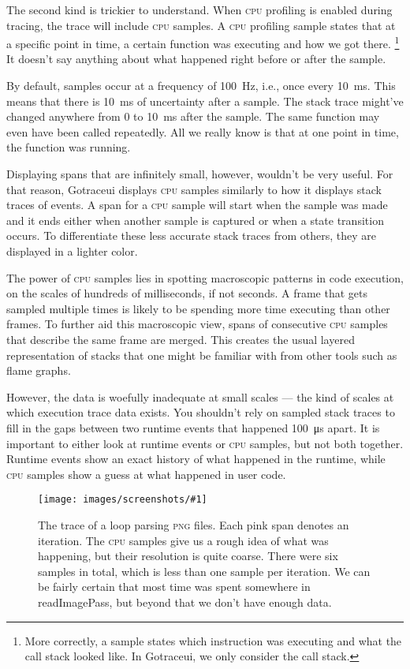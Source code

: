\documentclass[10pt,letterpaper,oneside,openany,english]{memoir}
\newcommand{\code}[1]{{\ttfamily\mbox{#1}}}
\newcommand{\screenshot}[2]{%
\begin{figure}[!ht]
  \centering
  \texttt{[image: images/screenshots/\#1]}
  \caption{#2}
\end{figure}}
\begin{document}
The second kind is trickier to understand. When \textsc{cpu} profiling is enabled during tracing, the trace will include \textsc{cpu} samples.
A \textsc{cpu} profiling sample states that at a specific point in time, a certain function was executing and how we got there.%
\footnote{More correctly, a sample states which instruction was executing and what the call stack looked like.
  In Gotraceui, we only consider the call stack.}
It doesn't say anything about what happened right before or after the sample.

By default, samples occur at a frequency of \qty{100}{\hertz}, i.e., once every \qty{10}{\milli\second}.
This means that there is \qty{10}{\milli\second} of uncertainty after a sample.
The stack trace might've changed anywhere from \num{0} to \qty{10}{\milli\second} after the sample.
The same function may even have been called repeatedly.
All we really know is that at one point in time, the function was running.

Displaying spans that are infinitely small, however, wouldn't be very useful.
For that reason, Gotraceui displays \textsc{cpu} samples similarly to how it displays stack traces of events.
A span for a \textsc{cpu} sample will start when the sample was made and it ends either when another sample is captured or when a state transition occurs.
To differentiate these less accurate stack traces from others, they are displayed in a lighter color.

The power of \textsc{cpu} samples lies in spotting macroscopic patterns in code execution, on the scales of hundreds of milliseconds, if not seconds.
A frame that gets sampled multiple times is likely to be spending more time executing than other frames.
To further aid this macroscopic view, spans of consecutive \textsc{cpu} samples that describe the same frame are merged.
This creates the usual layered representation of stacks that one might be familiar with from other tools such as flame graphs.

However, the data is woefully inadequate at small scales --- the kind of scales at which execution trace data exists.
You shouldn't rely on sampled stack traces to fill in the gaps between two runtime events that happened \qty{100}{\micro\second} apart.
It is important to either look at runtime events or \textsc{cpu} samples, but not both together.
Runtime events show an exact history of what happened in the runtime, while \textsc{cpu} samples show a guess at what happened in user code.

\screenshot{sampling.png}{%
  The trace of a loop parsing \textsc{png} files.
  Each pink span denotes an iteration.
  The \textsc{cpu} samples give us a rough idea of what was happening, but their resolution is quite coarse.
  There were six samples in total, which is less than one sample per iteration.
  We can be fairly certain that most time was spent somewhere in \code{readImagePass}, but beyond that we don't have enough data.
}
\end{document}
